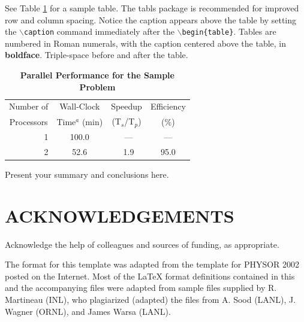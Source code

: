 \documentclass{ansconf}
\begin{document}
See Table \ref{table:example} for a sample table.  The tabls package is
recommended for improved row and column spacing.  Notice the caption appears 
above the table by setting the \texttt{$\backslash$caption} command immediately 
after the \texttt{$\backslash$begin\{table\}}. Tables are numbered in Roman 
numerals, with the caption centered above the table, in {\bf boldface}.  
Triple-space before and after the table.

\vspace{16pt}
\begin{table}[!htb]
\centering
\caption{\bf Parallel Performance for the Sample Problem}
\label{table:example} 
\vspace{14pt}
\begin{tabular}{||r||c|c|c||} \hline \hline
 \multicolumn{1}{||c||}{Number of} &
 \multicolumn{1}{c|}{Wall-Clock} &
 \multicolumn{1}{c|}{Speedup} &
 \multicolumn{1}{c||}{Efficiency} \\
 \multicolumn{1}{||c||}{Processors} &
 \multicolumn{1}{c|}{Time$^{a}$ (min)} &
 \multicolumn{1}{c|}{(T$_{s}$/T$_{p}$)} &
 \multicolumn{1}{c||}{(\%)} \\ \hline\hline
\ 1 &  100.0 & \ ---    & ---  \\ \hline
\ 2 &   52.6 & \ 1.9    & 95.0 \\ \hline \hline
\end{tabular}
\end{table}
\vspace{16pt}



Present your summary and conclusions here.


\section*{ACKNOWLEDGEMENTS}

Acknowledge the help of colleagues and sources of funding, as appropriate.

The format for this template was adapted from the template for PHYSOR 2002 
posted on the Internet.  Most of the {\LaTeX} format definitions contained
in this and the accompanying files were adapted from sample files supplied 
by R. Martineau (INL), who plagiarized (adapted) the files from A. Sood 
(LANL), J. Wagner (ORNL), and James Warsa (LANL).


\setlength{\baselineskip}{12pt}



\end{document}
